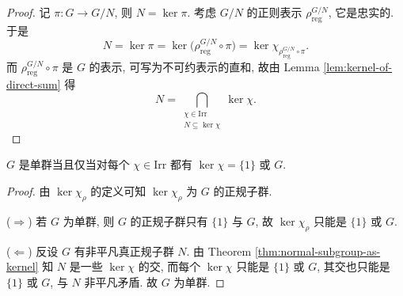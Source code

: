 \begin{proof}
记 $\pi\colon G\to G/N$, 则 $N=\ker\pi$. 考虑 $G/N$ 的正则表示
$\rho_{\mathrm{reg}}^{G/N}$, 它是忠实的. 于是
\[
  N=\ker\pi=\ker\bigl(\rho_{\mathrm{reg}}^{G/N}\circ\pi\bigr)
  =\ker\chi_{\rho_{\mathrm{reg}}^{G/N}\circ\pi}.
\]
而 $\rho_{\mathrm{reg}}^{G/N}\circ\pi$ 是 $G$ 的表示, 可写为不可约表示的直和, 故由
Lemma \ref{lem:kernel-of-direct-sum} 得
\[
  N=\bigcap_{\substack{\chi\in\mathrm{Irr}\\ N\subseteq\ker\chi}}\ker\chi .
\]
\end{proof}

\begin{corollary}\label{cor:simple-criterion}
$G$ 是单群当且仅当对每个 $\chi\in\mathrm{Irr}$ 都有 $\ker\chi=\{1\}$ 或 $G$.
\end{corollary}

\begin{proof}
由 $\ker\chi_\rho$ 的定义可知 $\ker\chi_\rho$ 为 $G$ 的正规子群.

($\Rightarrow$) 若 $G$ 为单群, 则 $G$ 的正规子群只有 $\{1\}$ 与 $G$, 故
$\ker\chi_\rho$ 只能是 $\{1\}$ 或 $G$.

($\Leftarrow$) 反设 $G$ 有非平凡真正规子群 $N$. 由
Theorem \ref{thm:normal-subgroup-as-kernel} 知 $N$ 是一些 $\ker\chi$ 的交, 而每个
$\ker\chi$ 只能是 $\{1\}$ 或 $G$, 其交也只能是 $\{1\}$ 或 $G$, 与 $N$ 非平凡矛盾.
故 $G$ 为单群.
\end{proof}
